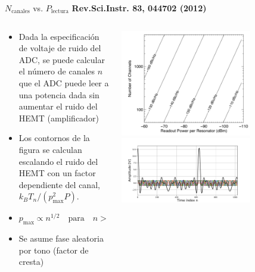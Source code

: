 \documentclass[ignorenonframetext,12pt]{beamer}
\begin{document}
\begin{frame}{$N_\text{canales}$ vs. $P_\text{lectura}$}
				\footnotesize{\textbf{Rev.Sci.Instr. 83, 044702 (2012)}}
				\begin{columns}
								\begin{column}{0.4\textwidth}
												\begin{itemize}
																\item \footnotesize{Dada la especificación de
																				voltaje de ruido del ADC, se puede
																				calcular el número de canales
																				{\color{red}$n$} que el ADC puede leer
																				a una potencia dada sin aumentar el
																				ruido del HEMT (amplificador)}
																\item Los contornos de la figura se calculan
																				escalando  el ruido del HEMT con un
																				factor dependiente del canal, $k_B
																				T_n /(p_\text{max}^2 P)$.
																\item $p_\text{max} \propto
																				n^{1/2}\quad\text{para}\quad n >> 1$
																\item {\color{blue}Se asume fase aleatoria por
																				tono (factor de cresta)}
												\end{itemize}
								\end{column}
								\begin{column}{0.6\textwidth}
												\centering
												\includegraphics[width=0.7\textwidth]{power_vs_Nchannels2}
												\includegraphics[width=0.7\textwidth]{in_spectrum_time}
								\end{column}
				\end{columns}
\end{frame}
\end{document}
